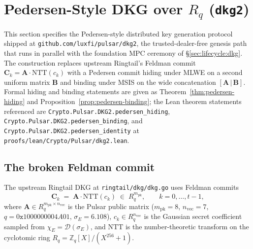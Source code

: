 \section{Pedersen-Style DKG over $R_q$ (\texttt{dkg2})}
\label{sec:pedersen-dkg}

This section specifies the Pedersen-style distributed key generation
protocol shipped at \texttt{github.com/luxfi/pulsar/dkg2}, the
trusted-dealer-free genesis path that runs in parallel with the
foundation MPC ceremony of \S\ref{sec:lifecycle:dkg}. The construction
replaces upstream Ringtail's Feldman commit
$\mathbf{C}_k = \mathbf{A}\cdot\mathrm{NTT}(c_k)$ with a Pedersen
commit hiding under MLWE on a second uniform matrix $\mathbf{B}$ and
binding under MSIS on the wide concatenation
$[\mathbf{A}\,|\,\mathbf{B}]$. Formal hiding and binding statements are
given as Theorem~\ref{thm:pedersen-hiding} and
Proposition~\ref{prop:pedersen-binding}; the Lean theorem statements
referenced are
\texttt{Crypto.Pulsar.DKG2.pedersen\_hiding},
\texttt{Crypto.Pulsar.DKG2.pedersen\_binding}, and
\texttt{Crypto.Pulsar.DKG2.pedersen\_identity} at
\texttt{proofs/lean/Crypto/Pulsar/dkg2.lean}.

\subsection{The broken Feldman commit}
\label{ssec:dkg-broken}

The upstream Ringtail DKG at \texttt{ringtail/dkg/dkg.go} uses Feldman
commits
\begin{equation}
\label{eq:feldman-broken}
\mathbf{C}_k \;=\; \mathbf{A}\cdot\mathrm{NTT}(c_k) \;\in\; R_q^{m_{\textrm{pk}}},
\qquad k = 0,\dots,t-1,
\end{equation}
where $\mathbf{A} \in R_q^{m_{\textrm{pk}} \times n_{\textrm{vec}}}$ is
the Pulsar public matrix
($m_{\textrm{pk}} = 8$, $n_{\textrm{vec}} = 7$,
$q = 0\mathtt{x}1000000004A01$, $\sigma_E = 6.108$),
$c_k \in R_q^{n_{\textrm{vec}}}$ is the Gaussian secret coefficient
sampled from $\chi_E = \mathcal{D}(\sigma_E)$, and $\mathrm{NTT}$ is the
number-theoretic transform on the cyclotomic ring $R_q = \mathbb{Z}_q[X]/(X^{256}+1)$.

